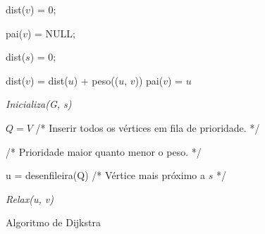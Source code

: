 \begin{easylist}
\begin{algorithm}[H]
\SetAlgoLined
{}
  {
    {
      dist($v$) = 0;

      pai($v$) = NULL;
    }
    dist($s$) = 0;
  }

  {
    { 
      dist($v$) = dist($u$) + peso(($u$, $v$))
    }
    pai($v$) = $u$
  }
  
  {
    \textit{Inicializa(G, s)}

    $Q = V$            /* Inserir todos os vértices em fila de prioridade. */
    
    \hspace{1cm}       /* Prioridade maior quanto menor o peso. */

    {
      u = desenfileira(Q) /* Vértice mais próximo a $s$ */

      {
        \textit{Relax(u, v)}
      }
    }
  }
  \caption{Algoritmo de Dijkstra}
\end{algorithm}



\end{easylist}










